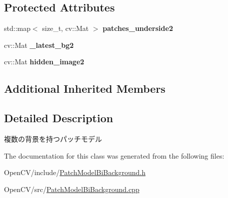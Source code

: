 \subsection*{Protected Attributes}
\begin{DoxyCompactItemize}
\item 
\hypertarget{classskl_1_1_patch_model_bi_background_acd9abc34b8445307c31e731094f1bf74}{}\label{classskl_1_1_patch_model_bi_background_acd9abc34b8445307c31e731094f1bf74} 
std\+::map$<$ size\+\_\+t, cv\+::\+Mat $>$ {\bfseries patches\+\_\+underside2}
\item 
\hypertarget{classskl_1_1_patch_model_bi_background_a599460502cd7df137d5c1e14a2798d13}{}\label{classskl_1_1_patch_model_bi_background_a599460502cd7df137d5c1e14a2798d13} 
cv\+::\+Mat {\bfseries \+\_\+latest\+\_\+bg2}
\item 
\hypertarget{classskl_1_1_patch_model_bi_background_abfe3ac42763123a21443d640f9f0cc1d}{}\label{classskl_1_1_patch_model_bi_background_abfe3ac42763123a21443d640f9f0cc1d} 
cv\+::\+Mat {\bfseries hidden\+\_\+image2}
\end{DoxyCompactItemize}
\subsection*{Additional Inherited Members}


\subsection{Detailed Description}
複数の背景を持つパッチモデル 

The documentation for this class was generated from the following files\+:\begin{DoxyCompactItemize}
\item 
Open\+C\+V/include/\hyperlink{_patch_model_bi_background_8h}{Patch\+Model\+Bi\+Background.\+h}\item 
Open\+C\+V/src/\hyperlink{_patch_model_bi_background_8cpp}{Patch\+Model\+Bi\+Background.\+cpp}\end{DoxyCompactItemize}
